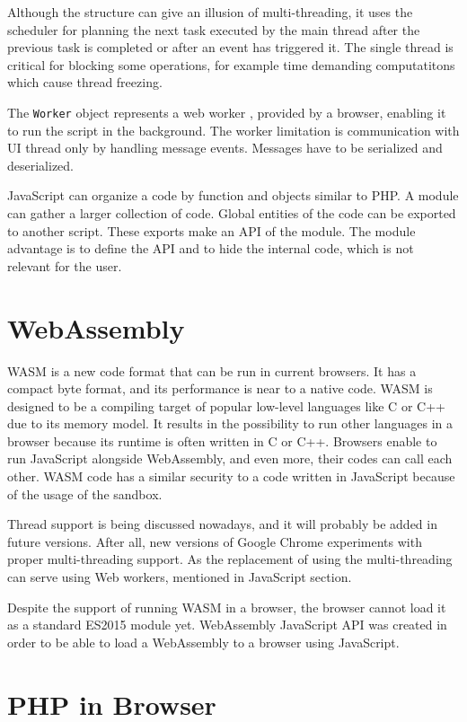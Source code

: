 Although the structure can give an illusion of multi-threading, it uses the scheduler for planning the next task executed by the main thread after the previous task is completed or after an event has triggered it.
The single thread is critical for blocking some operations, for example time demanding computatitons which cause thread freezing.
\par
The \texttt{Worker} object represents a web worker \cite{online:workers}, provided by a browser, enabling it to run the script in the background.
The worker limitation is communication with UI thread only by handling message events. 
Messages have to be serialized and deserialized.
\par
JavaScript can organize a code by function and objects similar to PHP.
A module can gather a larger collection of code.
Global entities of the code can be exported to another script.
These exports make an API of the module.
The module advantage is to define the API and to hide the internal code, which is not relevant for the user.

\section{WebAssembly}

WASM \cite{online:wasmConcepts} is a new code format that can be run in current browsers. 
It has a compact byte format, and its performance is near to a native code. 
WASM is designed to be a compiling target of popular low-level languages like C or C++ due to its memory model.
It results in the possibility to run other languages in a browser because its runtime is often written in C or C++.
Browsers enable to run JavaScript alongside WebAssembly, and even more, their codes can call each other.
WASM code has a similar security to a code written in JavaScript because of the usage of the sandbox. 
\par
Thread \cite{online:wasmThreads} support is being discussed nowadays, and it will probably be added in future versions.
After all, new versions of Google Chrome experiments with proper multi-threading support.
As the replacement of using the multi-threading can serve using Web workers, mentioned in JavaScript section.
\par
Despite the support of running WASM in a browser, the browser cannot load it as a standard ES2015 module yet.
WebAssembly JavaScript API was created in order to be able to load a WebAssembly to a browser using JavaScript.

\section{PHP in Browser}

